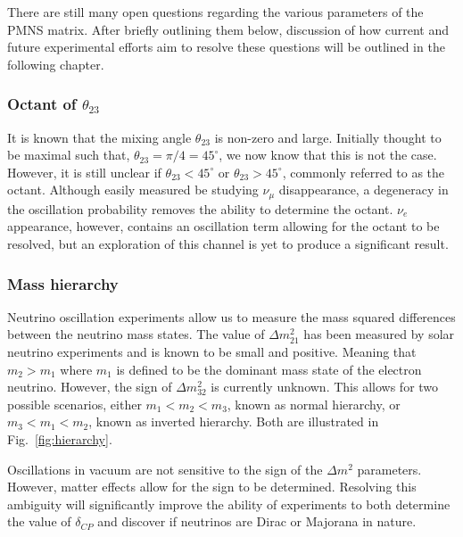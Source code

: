 There are still many open questions regarding the various parameters of the PMNS matrix. After
briefly outlining them below, discussion of how current and future experimental efforts aim to
resolve these questions will be outlined in the following chapter.

\subsubsection*{Octant of $\theta_{23}$} %

It is known that the mixing angle $\theta_{23}$ is non-zero and large. Initially thought to be
maximal such that, $\theta_{23}=\pi/4=45^{\circ}$, we now know that this is not the case. However,
it is still unclear if $\theta_{23}<45^{\circ}$ or $\theta_{23}>45^{\circ}$, commonly referred to
as the octant. Although easily measured be studying $\nu_{\mu}$ disappearance, a degeneracy in the
oscillation probability removes the ability to determine the octant. $\nu_{e}$ appearance,
however, contains an oscillation term allowing for the octant to be resolved, but an exploration
of this channel is yet to produce a significant result.

\subsubsection*{Mass hierarchy} %

Neutrino oscillation experiments allow us to measure the mass squared differences between the
neutrino mass states. The value of $\Delta m_{21}^2$ has been measured by solar neutrino
experiments and is known to be small and positive. Meaning that $m_{2}>m_{1}$ where $m_{1}$ is
defined to be the dominant mass state of the electron neutrino. However, the sign of $\Delta
    m_{32}^2$ is currently unknown. This allows for two possible scenarios, either $m_1<m_2<m_3$,
known as normal hierarchy, or $m_3<m_1<m_2$, known as inverted hierarchy. Both are illustrated in
Fig.~\ref{fig:hierarchy}.

Oscillations in vacuum are not sensitive to the sign of the $\Delta m^{2}$ parameters. However,
matter effects allow for the sign to be determined. Resolving this ambiguity will significantly
improve the ability of experiments to both determine the value of $\delta_{CP}$ and discover if
neutrinos are Dirac or Majorana in nature.

